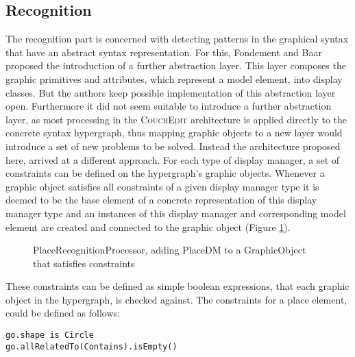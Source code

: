 \subsection{Recognition}
\label{sec:recognition}
The recognition part is concerned with detecting patterns in the graphical syntax that have an abstract syntax representation. For this, Fondement and Baar proposed the introduction of a further abstraction layer. This layer composes the graphic primitives and attributes, which represent a model element, into display classes. But the authors keep possible implementation of this abstraction layer open. Furthermore it did not seem suitable to introduce a further abstraction layer, as most processing in the \textsc{CouchEdit} architecture is applied directly to the concrete syntax hypergraph, thus mapping graphic objects to a new layer would introduce a set of new problems to be solved. Instead the architecture proposed here, arrived at a different approach. For each type of display manager, a set of constraints can be defined on the hypergraph's graphic objects. Whenever a graphic object satisfies all constraints of a given display manager type it is deemed to be the base element of a concrete representation of this display manager type and an instances of this display manager and corresponding model element are created and connected to the graphic object (Figure \ref{fig:place-recognition}).


\begin{figure}
  \centering
  
  \caption{PlaceRecognitionProcessor, adding PlaceDM to a GraphicObject that satisfies constraints}
  \label{fig:place-recognition}
\end{figure}

These constraints can be defined as simple boolean expressions, that each graphic object in the hypergraph, is checked against. The constraints for a place element, could be defined as follows:

\begin{lstlisting}[language=OCL,caption={Possible constraints to detect GOs representing a place},captionpos=b]
go.shape is Circle
go.allRelatedTo(Contains).isEmpty()
\end{lstlisting}

